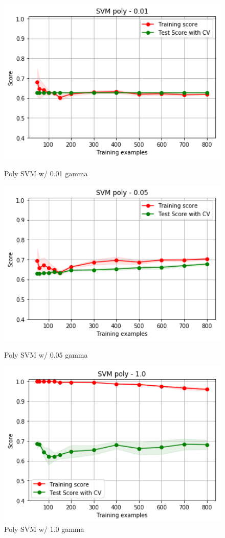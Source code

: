 \documentclass[h]{article}
\begin{document}
\begin{figure}[H]
      \includegraphics[width=1\textwidth,keepaspectratio]{2_svm_poly_01.png} 
      \caption*{Poly SVM w/ 0.01 gamma} 
   \endminipage\hfill
      \includegraphics[width=1\textwidth,keepaspectratio]{2_svm_poly_05.png} 
      \caption*{Poly SVM w/ 0.05 gamma} 
   \endminipage\hfill
      \includegraphics[width=1\textwidth,keepaspectratio]{2_svm_poly_1.png} 
      \caption*{Poly SVM w/ 1.0 gamma} 
   \endminipage\hfill
\end{figure}
\end{document}
